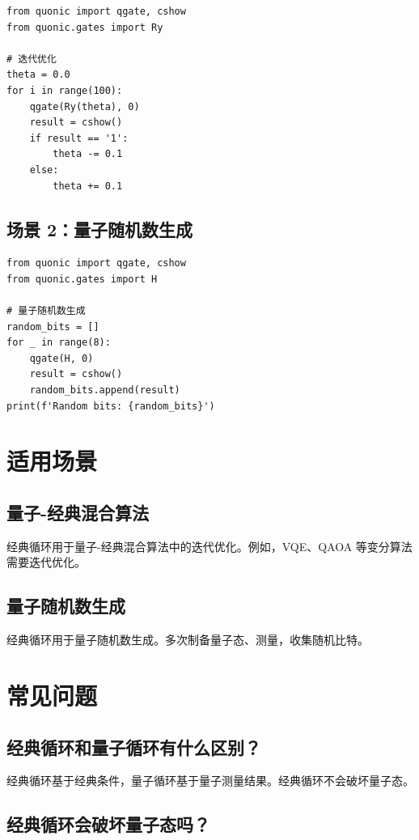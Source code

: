 \documentclass[12pt,a4paper]{article}
\begin{document}
\begin{verbatim}
from quonic import qgate, cshow
from quonic.gates import Ry

# 迭代优化
theta = 0.0
for i in range(100):
    qgate(Ry(theta), 0)
    result = cshow()
    if result == '1':
        theta -= 0.1
    else:
        theta += 0.1
\end{verbatim}

\subsection{场景 2：量子随机数生成}

\begin{verbatim}
from quonic import qgate, cshow
from quonic.gates import H

# 量子随机数生成
random_bits = []
for _ in range(8):
    qgate(H, 0)
    result = cshow()
    random_bits.append(result)
print(f'Random bits: {random_bits}')
\end{verbatim}

\section{适用场景}

\subsection{量子-经典混合算法}

经典循环用于量子-经典混合算法中的迭代优化。例如，VQE、QAOA 等变分算法需要迭代优化。

\subsection{量子随机数生成}

经典循环用于量子随机数生成。多次制备量子态、测量，收集随机比特。

\section{常见问题}

\subsection{经典循环和量子循环有什么区别？}

经典循环基于经典条件，量子循环基于量子测量结果。经典循环不会破坏量子态。

\subsection{经典循环会破坏量子态吗？}
\end{document}
